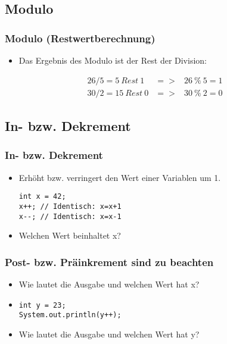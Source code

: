 \documentclass[final]{beamer}
\begin{document}
\subsection{Modulo}
\begin{frame}[fragile]
  \frametitle{Modulo (Restwertberechnung)}
\begin{itemize}
\item Das Ergebnis des Modulo ist der Rest der Division:
\end{itemize}
\begin{eqnarray*}
26 / 5 =  5\ Rest\ 1 &=>&    26\ \%\ 5 = 1\\
30 / 2 = 15\ Rest\ 0 &=>&    30\ \%\ 2 = 0
\end{eqnarray*}

\end{frame}

\subsection{In- bzw. Dekrement}
\begin{frame}[fragile]
  \frametitle{In- bzw. Dekrement}
  \begin{itemize}
    \item Erhöht bzw. verringert den Wert einer Variablen um 1.
    \begin{lstlisting}
int x = 42;
x++; // Identisch: x=x+1
x--; // Identisch: x=x-1
    \end{lstlisting}
\item[] Welchen Wert beinhaltet x? 
  \end{itemize}
\end{frame}

\begin{frame}[fragile]
\frametitle{Post- bzw. Präinkrement sind zu beachten}
\begin{itemize}
    \begin{lstlisting}
int x = 23;
System.out.println(++x);
\end{lstlisting}
\item[] Wie lautet die Ausgabe und welchen Wert hat x? 
\item[]\quad
\begin{lstlisting}
int y = 23;
System.out.println(y++);
    \end{lstlisting}
\item[] Wie lautet die Ausgabe und welchen Wert hat y? 
  \end{itemize}
\end{frame}
\end{document}
